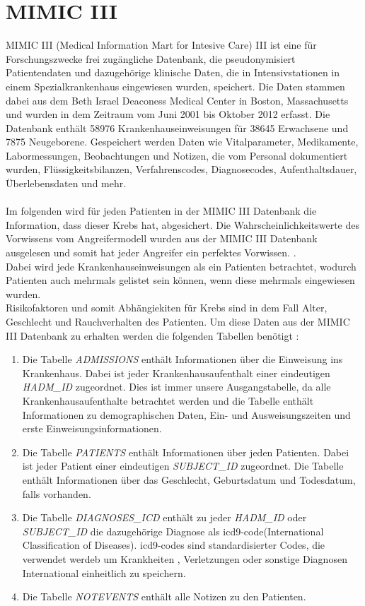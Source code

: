 \documentclass[german,version-2020-11]{uzl-thesis}
\begin{document}
\section{MIMIC III}
MIMIC III (Medical Information Mart for Intesive Care) III \cite{12} ist eine für Forschungszwecke frei zugängliche Datenbank, die pseudonymisiert Patientendaten und dazugehörige klinische Daten, die in Intensivstationen in einem Spezialkrankenhaus eingewiesen wurden, speichert. Die Daten stammen dabei aus dem Beth Israel Deaconess Medical Center in Boston, Massachusetts und wurden in dem Zeitraum vom Juni 2001 bis Oktober 2012 erfasst. Die Datenbank enthält 58976 Krankenhauseinweisungen für 38645 Erwachsene und 7875 Neugeborene. Gespeichert werden Daten wie Vitalparameter, Medikamente, Labormessungen, Beobachtungen und Notizen, die vom Personal dokumentiert wurden, Flüssigkeitsbilanzen, Verfahrenscodes, Diagnosecodes, Aufenthaltsdauer, Überlebensdaten und mehr.  \\ \\ 
Im folgenden wird für jeden Patienten in der MIMIC III Datenbank die Information, dass dieser Krebs hat, abgesichert. Die Wahrscheinlichkeitswerte des Vorwissens vom Angreifermodell wurden aus der MIMIC III Datenbank ausgelesen und somit hat jeder Angreifer ein perfektes Vorwissen.
. \\ Dabei wird jede Krankenhauseinweisungen als ein Patienten betrachtet, wodurch Patienten auch mehrmals gelistet sein können, wenn diese mehrmals eingewiesen wurden. \\ 
Risikofaktoren und somit Abhängiekiten für Krebs sind in dem Fall Alter, Geschlecht und Rauchverhalten des Patienten.\cite{13,14} Um diese Daten aus der MIMIC III Datenbank zu erhalten werden die folgenden Tabellen benötigt : 
\begin{enumerate}
	\item Die Tabelle \textit{ADMISSIONS}  enthält Informationen über die Einweisung ins Krankenhaus. Dabei ist jeder Krankenhausaufenthalt einer eindeutigen \textit{HADM\_ID} zugeordnet. Dies ist immer unsere Ausgangstabelle, da alle Krankenhausaufenthalte betrachtet werden und die Tabelle enthält Informationen zu demographischen Daten, Ein- und Ausweisungszeiten und erste Einweisungsinformationen.
	\item Die Tabelle \textit{PATIENTS} enthält Informationen über jeden Patienten. Dabei ist jeder Patient einer eindeutigen \textit{SUBJECT\_ID} zugeordnet. Die Tabelle enthält Informationen über das Geschlecht, Geburtsdatum und Todesdatum, falls vorhanden.
	\item Die Tabelle \textit{DIAGNOSES\_ICD} enthält zu jeder \textit{HADM\_ID} oder \textit{SUBJECT\_ID} die dazugehörige Diagnose als icd9-code(International Classification of Diseases). icd9-codes sind standardisierter Codes, die verwendet  werdeb um Krankheiten , Verletzungen oder sonstige Diagnosen International einheitlich zu speichern\cite{15}.
	\item Die Tabelle \textit{NOTEVENTS } enthält alle Notizen zu den Patienten.
\end{enumerate} 
\end{document}
